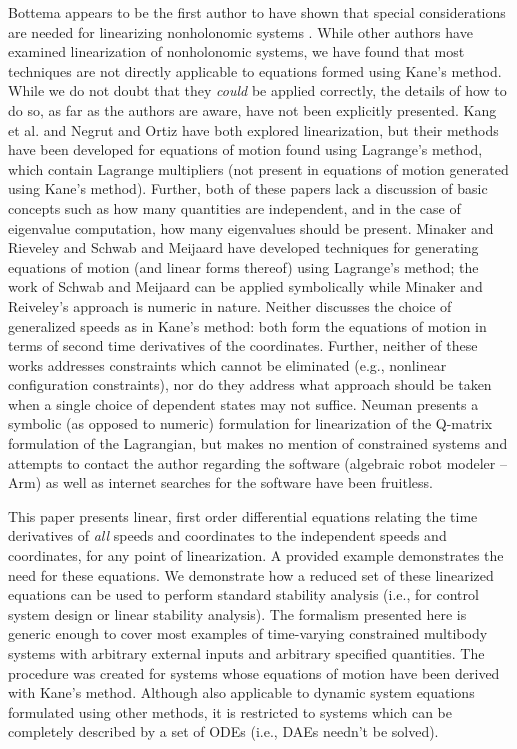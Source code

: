 \documentclass[smallcondensed,final]{svjour3}                     %
\begin{document}
Bottema appears to be the first author to have shown that special
considerations are needed for linearizing nonholonomic systems
\cite{Bottema1949}. While other authors have examined linearization of
nonholonomic systems, we have found that most techniques are not directly
applicable to equations formed using Kane's method. While we do not doubt that
they \textit{could} be applied correctly, the details of how to do so, as far
as the authors are aware, have not been explicitly presented. Kang et al.
\cite{Kang2003} and Negrut and Ortiz \cite{Negrut2006} have both explored
linearization, but their methods have been developed for equations of motion
found using Lagrange's method, which contain Lagrange multipliers (not present
in equations of motion generated using Kane's method). Further, both of these
papers lack a discussion of basic concepts such as how many quantities are
independent, and in the case of eigenvalue computation, how many eigenvalues
should be present. Minaker and Rieveley \cite{Minaker2010} and Schwab and
Meijaard \cite{Schwab2003} have developed techniques for generating equations
of motion (and linear forms thereof) using Lagrange's method; the work of
Schwab and Meijaard can be applied symbolically while Minaker and Reiveley's
approach is numeric in nature. Neither discusses the choice of generalized
speeds as in Kane's method: both form the equations of motion in terms of
second time derivatives of the coordinates.  Further, neither of these works
addresses constraints which cannot be eliminated (e.g., nonlinear configuration
constraints), nor do they address what approach should be taken when a single
choice of dependent states may not suffice.  Neuman \cite{Neuman1984} presents
a symbolic (as opposed to numeric) formulation for linearization of the
Q-matrix formulation of the Lagrangian, but makes no mention of constrained
systems and attempts to contact the author regarding the software (algebraic
robot modeler -- Arm) as well as internet searches for the software have been
fruitless.


This paper presents linear, first order differential equations relating the
time derivatives of \textit{all} speeds and coordinates to the independent
speeds and coordinates, for any point of linearization.  A provided example
demonstrates the need for these equations.  We demonstrate how a reduced
set of these linearized equations can be used to perform standard stability
analysis (i.e., for control system design or linear stability analysis).  The
formalism presented here is generic enough to cover most examples of
time-varying constrained multibody systems with arbitrary external inputs and
arbitrary specified quantities.
The procedure was created for systems whose equations of motion have been
derived with Kane's method. Although also applicable to dynamic system
equations formulated using other methods, it is restricted to systems which can
be completely described by a set of ODEs (i.e., DAEs needn't be solved).
\end{document}

